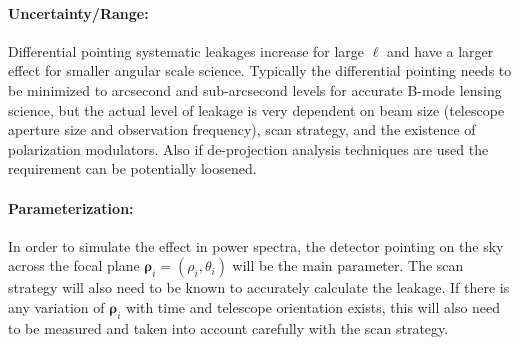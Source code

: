 \paragraph{Uncertainty/Range:}
Differential pointing systematic leakages increase for large $\ell$ and have a larger effect for smaller angular scale science. Typically the differential pointing needs to be minimized to arcsecond and sub-arcsecond levels for accurate B-mode lensing science, but the actual level of leakage is very dependent on beam size (telescope aperture size and observation frequency), scan strategy, and the existence of polarization modulators. Also if de-projection analysis techniques are used the requirement can be potentially loosened.

\paragraph{Parameterization:}
In order to simulate the effect in power spectra, the detector pointing on the sky across the focal plane $\boldsymbol{\rho}_{i} = (\rho_{i},\theta_{i})$ will be the main parameter. The scan strategy will also need to be known to accurately calculate the leakage. If there is any variation of $\boldsymbol{\rho}_{i}$ with time and telescope orientation exists, this will also need to be measured and taken into account carefully with the scan strategy.
